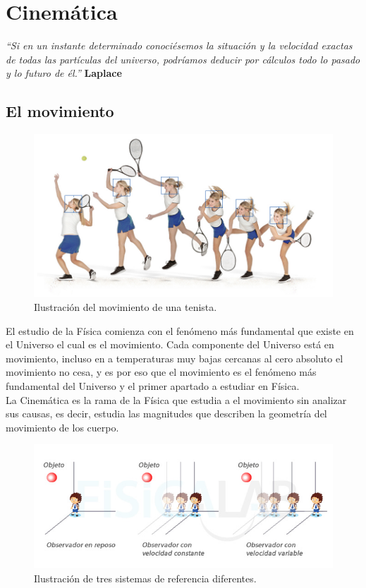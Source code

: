 \documentclass[a5paper,pagesize,10pt,bibtotoc,pointlessnumbers,
normalheadings,DIV=9,fleqn,x11names,table,twoside=false]{scrbook}
\begin{document}
\chapter{Cinemática}

\textit{``Si en un instante determinado conociésemos la situación y la velocidad exactas de todas las partículas del universo, 
podríamos deducir por cálculos todo lo pasado y lo futuro de él.''}  \textbf{Laplace}

\section{El movimiento}

\begin{figure}[ht]
 \centering
 \includegraphics[scale=0.3]{images/movimiento.jpg}
 \caption{Ilustración del movimiento de una tenista.}
 \label{fig:vectorial}
\end{figure}

El estudio de la Física comienza con el fenómeno más fundamental que existe en el Universo el cual es el movimiento. Cada 
componente del Universo está en movimiento, incluso en a temperaturas muy bajas cercanas al cero absoluto el movimiento no cesa, y 
es por eso que el movimiento es el fenómeno más fundamental del Universo y el primer apartado a estudiar en Física.\\

La Cinemática es la rama de la Física que estudia a el movimiento sin analizar sus causas, es decir, estudia las magnitudes que 
describen la geometría del movimiento de los cuerpo.\\ 

\begin{figure}[ht]
 \centering
 \includegraphics[scale=0.37]{images/sistema_inercial_no_inercial.jpg}
 \caption{Ilustración de tres sistemas de referencia diferentes.}
\end{figure}
\end{document}
